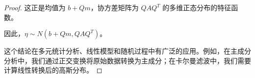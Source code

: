 \documentclass[lang=cn,10pt,thmcnt=section]{elegantbook}
\begin{document}
\begin{proof}
		这正是均值为 $b + Qm$，协方差矩阵为 $QAQ^T$ 的多维正态分布的特征函数。
		
		因此，$\eta \sim N(b + Qm, QAQ^T)$。
		
		这个结论在多元统计分析、线性模型和随机过程中有广泛的应用。例如，在主成分分析中，我们通过正交变换将原始数据转换为主成分；在卡尔曼滤波中，我们需要计算线性转换后的高斯分布。
\end{proof}
\end{document}
